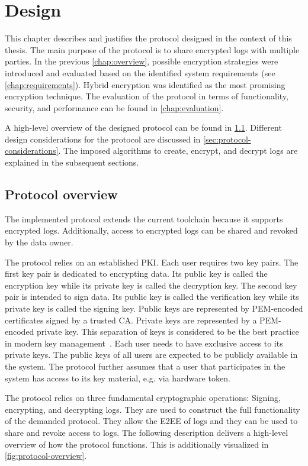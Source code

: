 \documentclass[../main.tex]{subfiles}
\begin{document}
\chapter{Design}
\label{chap:design}

This chapter describes and justifies the protocol designed in the context of this thesis.
The main purpose of the protocol is to share encrypted logs with multiple parties.
In the previous \cref{chap:overview}, possible encryption strategies were introduced and evaluated based on the identified system requirements (see \cref{chap:requirements}).
Hybrid encryption was identified as the most promising encryption technique.
The evaluation of the protocol in terms of functionality, security, and performance can be found in \cref{chap:evaluation}.

A high-level overview of the designed protocol can be found in \cref{sec:overview}.
Different design considerations for the protocol are discussed in \cref{sec:protocol-considerations}.
The imposed algorithms to create, encrypt, and decrypt logs are explained in the subsequent sections. 

\section{Protocol overview}
\label{sec:overview}

The implemented protocol extends the current toolchain because it supports encrypted logs.
Additionally, access to encrypted logs can be shared and revoked by the data owner.

The protocol relies on an established PKI.
Each user requires two key pairs.
The first key pair is dedicated to encrypting data.
Its public key is called the encryption key while its private key is called the decryption key.
The second key pair is intended to sign data.
Its public key is called the verification key while its private key is called the signing key.
Public keys are represented by PEM-encoded certificates signed by a trusted CA.
Private keys are represented by a PEM-encoded private key.
This separation of keys is considered to be the best practice in modern key management~\cite[33]{Barker2006}.
Each user needs to have exclusive access to its private keys.
The public keys of all users are expected to be publicly available in the system.
The protocol further assumes that a user that participates in the system has access to its key material, e.g. via hardware token.

The protocol relies on three fundamental cryptographic operations:
Signing, encrypting, and decrypting logs.
They are used to construct the full functionality of the demanded protocol.
They allow the E2EE of logs and they can be used to share and revoke access to logs.
The following description delivers a high-level overview of how the protocol functions.
This is additionally visualized in \cref{fig:protocol-overview}.
\end{document}
